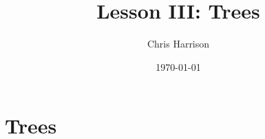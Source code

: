 \documentclass[11pt,a4paper]{article}
\title{Lesson III: Trees}
\author{Chris Harrison}
\date{\today}
\begin{document}
\maketitle 

\section{Trees}
\label{title}
\end{document}
